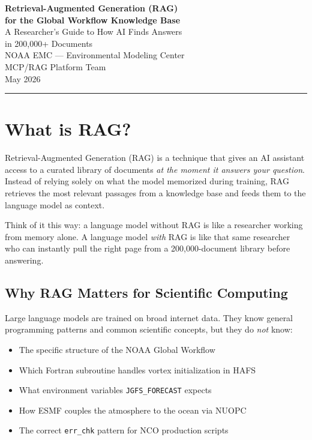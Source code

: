 \documentclass[11pt,letterpaper]{article}
\begin{document}
\begin{center}
{\LARGE\bfseries Retrieval-Augmented Generation (RAG)\\[4pt]
for the Global Workflow Knowledge Base}\\[12pt]
{\large A Researcher's Guide to How AI Finds Answers\\
in 200,000+ Documents}\\[20pt]
{\normalsize NOAA EMC — Environmental Modeling Center\\
MCP/RAG Platform Team\\[8pt]
May 2026}
\end{center}

\vspace{1em}
\hrule
\vspace{1em}

\tableofcontents
\newpage

\section{What is RAG?}

Retrieval-Augmented Generation (RAG) is a technique that gives an AI
assistant access to a curated library of documents \emph{at the moment
it answers your question}. Instead of relying solely on what the model
memorized during training, RAG retrieves the most relevant passages
from a knowledge base and feeds them to the language model as context.

Think of it this way: a language model without RAG is like a researcher
working from memory alone. A language model \emph{with} RAG is like
that same researcher who can instantly pull the right page from a
200,000-document library before answering.

\subsection{Why RAG Matters for Scientific Computing}

Large language models are trained on broad internet data. They know
general programming patterns and common scientific concepts, but they
do \emph{not} know:

\begin{itemize}[nosep]
    \item The specific structure of the NOAA Global Workflow
    \item Which Fortran subroutine handles vortex initialization in HAFS
    \item What environment variables \texttt{JGFS\_FORECAST} expects
    \item How ESMF couples the atmosphere to the ocean via NUOPC
    \item The correct \texttt{err\_chk} pattern for NCO production scripts
\end{itemize}
\end{document}
